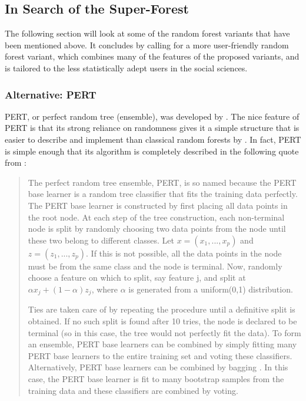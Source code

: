 \documentclass[a4paper,man,12pt,apacite,floatsintext]{apa6} %
\begin{document}
\subsection{In Search of the Super-Forest}
The following section will look at some of the random forest variants that
have been mentioned above. It concludes by calling for a more
user-friendly random forest variant, which combines many of the features of
the proposed variants, and is tailored to the less statistically adept users
in the social sciences.

\subsubsection{Alternative: PERT}
PERT, or perfect random tree (ensemble), was developed by .
The nice feature of PERT is that its strong reliance on randomness gives
it a simple structure that is easier to describe and implement than
classical random forests by .
In fact, PERT is simple enough that its algorithm is completely described
in the following quote from :

\begin{quotation}
The perfect random tree ensemble, PERT, is so named because the PERT base
learner is a random tree classifier that fits the training data perfectly.
The PERT base learner is constructed by first placing all data points in
the root node.
At each step of the tree construction, each non-terminal node is split by
randomly choosing two data points from the node until these two belong to
different classes.
Let \( x = (x_{1} , . . . , x_{p} ) \) and \( z = (z_{1} , . . . , z_{p} ) \).
If this is not possible, all the data points in the node must be from the
same class and the node is terminal.
Now, randomly choose a feature on which to split, say feature j, and split
at \( \alpha x_{j} + (1 - \alpha) z_{j} \), where \( \alpha \) is generated
from a uniform(0,1) distribution.

Ties are taken care of by repeating the procedure until a definitive
split is obtained.
If no such split is found after 10 tries, the node is declared to be
terminal (so in this case, the tree would not perfectly fit the data).
To form an ensemble, PERT base learners can be combined by simply fitting
many PERT base learners to the entire training set and voting these
classifiers.
Alternatively, PERT base learners can be combined by bagging
\cite{breiman1996bagging}.
In this case, the PERT base learner is fit to many bootstrap samples
from the training data and these classifiers are combined by voting.
\end{quotation}
\end{document}
